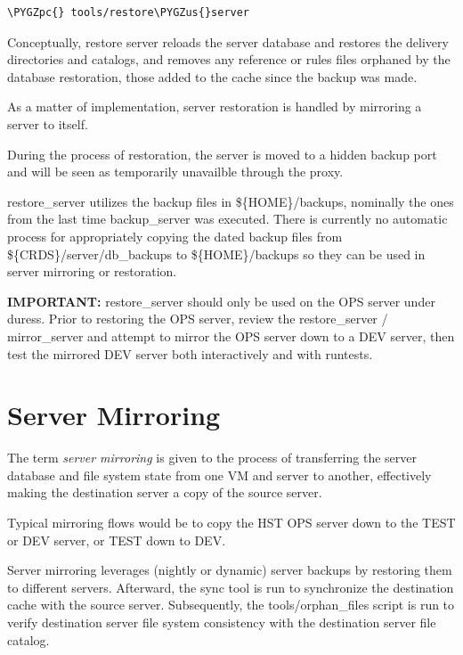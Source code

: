 \documentclass[letterpaper,10pt,english]{sphinxmanual}
\def\PYGZus{\char`\_}
\def\PYGZpc{\char`\%}
\begin{document}
\begin{Verbatim}[commandchars=\\\{\}]
\PYGZpc{} tools/restore\PYGZus{}server
\end{Verbatim}

Conceptually,  restore server reloads the server database and restores the delivery directories and catalogs,  and
removes any reference or rules files orphaned by the database restoration,  those added to the cache since the backup
was made.

As a matter of implementation,  server restoration is handled by mirroring a server to itself.

During the process of restoration,  the server is moved to a hidden backup port and will be seen as temporarily
unavailble through the proxy.

restore\_server utilizes the backup files in \$\{HOME\}/backups,  nominally the ones from the last time backup\_server was
executed.   There is currently no automatic process for appropriately copying the dated backup files from
\$\{CRDS\}/server/db\_backups to \$\{HOME\}/backups so they can be used in server mirroring or restoration.

\textbf{IMPORTANT:}  restore\_server should only be used on the OPS server under duress.   Prior to restoring the OPS server,
review the restore\_server / mirror\_server and attempt to mirror the OPS server down to a DEV server,  then test the
mirrored DEV server both interactively and with runtests.


\section{Server Mirroring}
\label{server_guide:server-mirroring}
The term \emph{server mirroring} is given to the process of transferring the server database and file system state from one
VM and server to another,  effectively making the destination server a copy of the source server.

Typical mirroring flows would be to copy the HST OPS server down to the TEST or DEV server,  or TEST down to DEV.

Server mirroring leverages (nightly or dynamic) server backups by restoring them to different servers.  Afterward,
the sync tool is run to synchronize the destination cache with the source server.   Subsequently,  the tools/orphan\_files
script is run to verify destination server file system consistency with the destination server file catalog.
\end{document}
